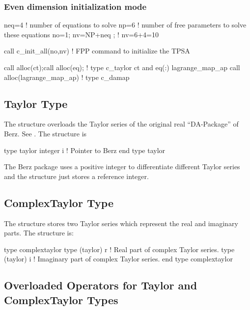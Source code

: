 \documentclass{hitec}     %
\begin{document}
{{{{\subsubsection{Even dimension initialization mode}
\label{s:initeven}

\begin{code}
neq=4    ! number of equations to solve
np=6     ! number of free parameters to solve these equations
no=1; nv=NP+neq ;  ! nv=6+4=10

call c_init_all(no,nv)   ! FPP command to initialize the TPSA

call alloc(ct);call alloc(eq);  ! type c_taylor ct and eq(:)
lagrange_map_ap%
call alloc(lagrange_map_ap)  ! type c_damap 
\end{code}


\subsection{Taylor Type}
\label{s:taylor}

The  structure overloads the Taylor series of the original real ``DA-Package'' of
Berz. See . The structure is
\begin{code}
type taylor
   integer i    ! Pointer to Berz
end type taylor
\end{code}
The Berz package uses a positive integer to differentiate different Taylor series and the
 structure just stores a reference integer.

\subsection{ComplexTaylor Type}
\label{s:taylor}

The  structure stores two Taylor series which represent the real and imaginary parts.
The structure is:
\begin{code}
type complextaylor
   type (taylor) r     ! Real part of complex Taylor series.
   type (taylor) i     ! Imaginary part of complex Taylor series.
end type complextaylor
\end{code}

\subsection{Overloaded Operators for Taylor and ComplexTaylor Types}
\label{s:taylor.over}

}}}}
\end{document}
